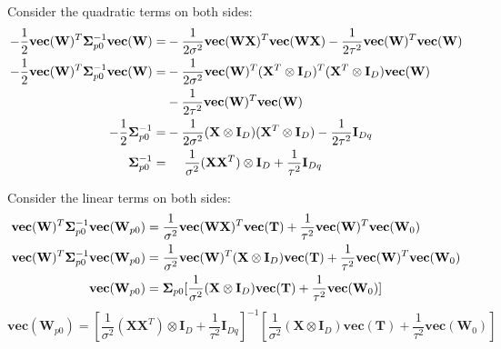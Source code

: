 \documentclass[12pt]{article}
\newenvironment{question}[2][Question]{\begin{trivlist}
\kern10pt
\item[\hskip \labelsep {\bfseries #1}\hskip \labelsep {\bfseries #2.}]}{\end{trivlist}}
\begin{document}
\begin{question}{5}
Consider the quadratic terms on both sides:
\begin{equation} \label{eq:q5-covar}
  \begin{aligned}[b]
    -\frac12\textbf{vec}(\textbf{W})^T\bm{\Sigma}_{p0}^{-1}\textbf{vec}(\textbf{W})
    =& -\frac{1}{2\sigma^2}\textbf{vec}(\textbf{WX})^T\textbf{vec}(\textbf{WX})
    -\frac{1}{2\tau^2}\textbf{vec}(\textbf{W})^T\textbf{vec}(\textbf{W}) \\
    -\frac12\textbf{vec}(\textbf{W})^T\bm{\Sigma}_{p0}^{-1}\textbf{vec}(\textbf{W})
    =& -\frac{1}{2\sigma^2}\textbf{vec}(\textbf{W})^T(\mathbf{X}^T \otimes \mathbf{I}_D)^T
    (\mathbf{X}^T \otimes \mathbf{I}_D)\textbf{vec}(\textbf{W}) \\
    & -\frac{1}{2\tau^2}\textbf{vec}(\textbf{W})^T\textbf{vec}(\textbf{W}) \\
    -\frac12\bm{\Sigma}_{p0}^{-1} =&
    -\frac{1}{2\sigma^2}(\mathbf{X} \otimes \mathbf{I}_D)(\mathbf{X}^T \otimes \mathbf{I}_D) 
    -\frac{1}{2\tau^2} \mathbf{I}_{Dq}\\
    \bm{\Sigma}_{p0}^{-1} =& \hspace{5mm} 
    \frac{1}{\sigma^2}(\mathbf{X}\mathbf{X}^T)\otimes \mathbf{I}_D +\frac{1}{\tau^2}\mathbf{I}_{Dq}
  \end{aligned}
\end{equation}

Consider the linear terms on both sides:  
\begin{align*}
    \textbf{vec}(\textbf{W})^T\bm{\Sigma}_{p0}^{-1}\textbf{vec}(\textbf{W}_{p0})
    =& \hspace{1mm} 
       \frac{1}{\sigma^2}\textbf{vec}(\textbf{WX})^T\textbf{vec}(\textbf{T}) 
     + \frac{1}{\tau^2}\textbf{vec}(\textbf{W})^T\textbf{vec}(\textbf{W}_0)\\
    \textbf{vec}(\textbf{W})^T\bm{\Sigma}_{p0}^{-1}\textbf{vec}(\textbf{W}_{p0})
    =& \hspace{1mm} 
       \frac{1}{\sigma^2}\textbf{vec}(\textbf{W})^T(\mathbf{X}\otimes\mathbf{I}_D)
       \textbf{vec}(\textbf{T}) 
     + \frac{1}{\tau^2}\textbf{vec}(\textbf{W})^T\textbf{vec}(\textbf{W}_0)\\
    \textbf{vec}(\textbf{W}_{p0}) =& \hspace{1mm} 
       \bm{\Sigma}_{p0}[\frac{1}{\sigma^2}(\mathbf{X}\otimes\mathbf{I}_D)
       \textbf{vec}(\textbf{T}) + \frac{1}{\tau^2}\textbf{vec}(\textbf{W}_0)] \\
\end{align*}
\begin{equation} \label{eq:q5-mean}
    \textbf{vec}(\textbf{W}_{p0}) =
    [\frac{1}{\sigma^2}(\mathbf{X}\mathbf{X}^T)\otimes \mathbf{I}_D +\frac{1}{\tau^2}\mathbf{I}_{Dq}]^{-1}
       [\frac{1}{\sigma^2}(\mathbf{X}\otimes\mathbf{I}_D)
       \textbf{vec}(\textbf{T}) + \frac{1}{\tau^2}\textbf{vec}(\textbf{W}_0)]
\end{equation}


\end{question}
\end{document}
